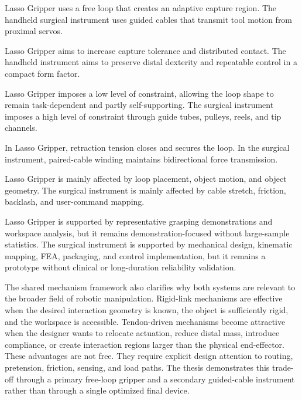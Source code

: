 \begin{description}[style=nextline,leftmargin=1.5em,labelindent=0pt,itemsep=0.8em]
    \item[\textbf{Tensile element role.}]
    Lasso Gripper uses a free loop that creates an adaptive capture region. The handheld surgical instrument uses guided cables that transmit tool motion from proximal servos.

    \item[\textbf{Primary objective.}]
    Lasso Gripper aims to increase capture tolerance and distributed contact. The handheld instrument aims to preserve distal dexterity and repeatable control in a compact form factor.

    \item[\textbf{Routing constraint.}]
    Lasso Gripper imposes a low level of constraint, allowing the loop shape to remain task-dependent and partly self-supporting. The surgical instrument imposes a high level of constraint through guide tubes, pulleys, reels, and tip channels.

    \item[\textbf{Tension management.}]
    In Lasso Gripper, retraction tension closes and secures the loop. In the surgical instrument, paired-cable winding maintains bidirectional force transmission.

    \item[\textbf{Main uncertainty.}]
    Lasso Gripper is mainly affected by loop placement, object motion, and object geometry. The surgical instrument is mainly affected by cable stretch, friction, backlash, and user-command mapping.

    \item[\textbf{Validation evidence and limitation.}]
    Lasso Gripper is supported by representative grasping demonstrations and workspace analysis, but it remains demonstration-focused without large-sample statistics. The surgical instrument is supported by mechanical design, kinematic mapping, FEA, packaging, and control implementation, but it remains a prototype without clinical or long-duration reliability validation.
\end{description}

The shared mechanism framework also clarifies why both systems are relevant to the broader field of robotic manipulation. Rigid-link mechanisms are effective when the desired interaction geometry is known, the object is sufficiently rigid, and the workspace is accessible. Tendon-driven mechanisms become attractive when the designer wants to relocate actuation, reduce distal mass, introduce compliance, or create interaction regions larger than the physical end-effector. These advantages are not free. They require explicit design attention to routing, pretension, friction, sensing, and load paths. The thesis demonstrates this trade-off through a primary free-loop gripper and a secondary guided-cable instrument rather than through a single optimized final device.

